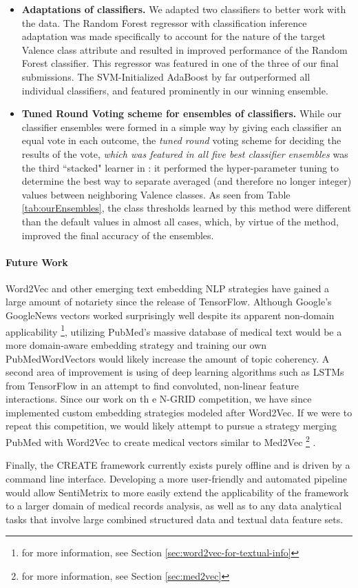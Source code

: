 \begin{itemize}
\item \textbf{Adaptations of classifiers.} We adapted two classifiers
to better work with the data. The \textsf{Random Forest regressor with classification
inference} adaptation was made specifically to account for the nature
of the target \textsf{Valence} class attribute and resulted in improved
performance of the Random Forest classifier. This regressor was featured
in one of the three of our final submissions.  The 
\textsf{SVM-Initialized AdaBoost} by far outperformed all individual
classifiers, and featured prominently in our winning ensemble.


\item \textbf{Tuned Round Voting scheme for ensembles of classifiers.} While
our classifier ensembles were formed in a simple way by giving each classifier
an equal vote in each outcome, the \textit{tuned round} voting scheme for
deciding the results of the vote, \textit{which was featured in all five
best classifier ensembles} was the third ``stacked" learner in \CREATE:
it performed the hyper-parameter tuning to determine the best
way to separate averaged (and therefore no longer integer) values
between neighboring \textsf{Valence} classes. As seen
from Table \ref{tab:ourEnsembles}, the class thresholds learned 
by this method were different than the default values in almost all
cases, which, by virtue of the method, improved the final accuracy of
the ensembles.

\end{itemize}


\paragraph{Future Work} \textsf{Word2Vec} and other emerging text embedding NLP strategies have gained a large amount of notariety since the release of TensorFlow. Although Google's \textsf{GoogleNews} vectors worked surprisingly well despite its apparent non-domain applicability \footnote{for more information, see Section \ref{sec:word2vec-for-textual-info}}, utilizing PubMed's massive database of medical text would be a more domain-aware embedding strategy and training our own \textsf{PubMedWordVectors} would likely increase the amount of topic coherency. A second area of improvement is using of deep learning algorithms such as \textsf{LSTMs} from TensorFlow \cite{tensorflow} in an attempt to find convoluted, non-linear feature interactions. Since our work on th e N-GRID competition, we have since implemented custom embedding strategies modeled after Word2Vec. If we were to repeat this competition, we would likely attempt to pursue a strategy merging PubMed with Word2Vec to create medical vectors similar to Med2Vec \footnote{for more information, see Section \ref{sec:med2vec}} \cite{med2vec}.

Finally, the CREATE framework currently exists purely offline and is driven by a command line interface. Developing a more user-friendly and automated pipeline would allow SentiMetrix to more easily extend the applicability of the framework to a larger domain of medical records
analysis, as well as to any data analytical tasks that involve large combined structured data and textual data feature sets.
